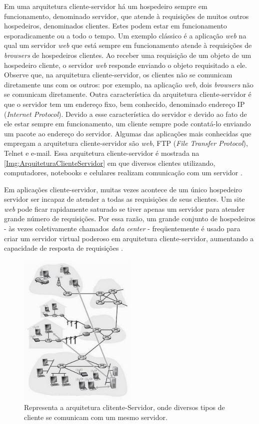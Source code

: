 		Em uma arquitetura cliente-servidor há um hospedeiro sempre em funcionamento, denominado servidor, que atende à requisições de muitos outros hospedeiros, denominados clientes. Estes podem estar em funcionamento esporadicamente ou a todo o tempo. Um exemplo clássico é a aplicação \textit{web} na qual um servidor \textit{web} que está sempre em funcionamento atende à requisições de \textit{browsers} de hospedeiros clientes. Ao receber uma requisição de um objeto de um hospedeiro cliente, o servidor \textit{web} responde enviando o objeto requisitado a ele. Observe que, na arquitetura cliente-servidor, os clientes não se comunicam diretamente uns com os outros: por exemplo, na aplicação \textit{web}, dois \textit{browsers} não se comunicam diretamente. Outra característica da arquitetura cliente-servidor é que o servidor tem um endereço fixo, bem conhecido, denominado endereço IP (\textit{Internet Protocol}). Devido a esse característica do servidor e devido ao fato de ele estar sempre em funcionamento, um cliente sempre pode contatá-lo enviando um pacote ao endereço do servidor. Algumas das aplicações mais conhecidas que empregam a arquitetura cliente-servidor são \textit{web}, FTP (\textit{File Transfer Protocol}), Telnet e e-mail. Essa arquitetura cliente-servidor é mostrada na \autoref{Img:ArquiteturaClienteServidor} em que diversos clientes utilizando, computadores, notebooks e celulares realizam comunicação com um servidor \cite{Kurose:2010}.

Em aplicações cliente-servidor, muitas vezes acontece de um único hospedeiro servidor ser incapaz de atender a todas as requisições de seus clientes. Um site \textit{web} pode ficar rapidamente saturado se tiver apenas um servidor para atender grande número de requisições. Por essa razão, um grande conjunto de hospedeiros - às vezes coletivamente chamados \textit{data center} - freqüentemente é usado para criar um servidor virtual poderoso em arquitetura cliente-servidor, aumentando a capacidade de resposta de requisições \cite{Kurose:2010}.


\begin{figure}
	\centering
	\includegraphics[width=0.5\textwidth]{figuras/KuroseClienteServidorpg88.jpg}
	\caption[Arquitetura Cliente-Servidor.]{Representa a arquitetura clitente-Servidor, onde diversos tipos de cliente se comunicam com um mesmo servidor.}
	\label{Img:ArquiteturaClienteServidor}
\end{figure}


